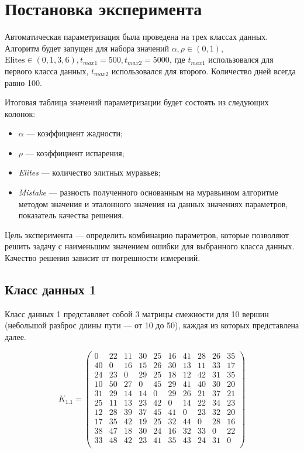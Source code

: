 \clearpage

\section{Постановка эксперимента}

Автоматическая параметризация была проведена на трех классах данных.
Алгоритм будет запущен для набора значений $\alpha, \rho \in (0, 1)$, $\text{Elites} \in (0, 1, 3, 6), t_{max1} = 500, t_{max2} = 5000$, где $t_{max1}$ использовался для первого класса данных, $t_{max2}$ использовался для второго.
Количество дней всегда равно 100.

Итоговая таблица значений параметризации будет состоять из следующих колонок:
\begin{itemize}[label=---]
	\item $\alpha$ --- коэффициент жадности;
	\item $\rho$ --- коэффициент испарения;
	\item \textit{Elites} --- количество элитных муравьев;
	\item \textit{Mistake} --- разность полученного основанным на муравьином алгоритме методом значения и эталонного значения на данных значениях параметров, показатель качества решения.
\end{itemize}

Цель эксперимента --- определить комбинацию параметров, которые позволяют решить задачу с наименьшим значением ошибки для выбранного класса данных.
Качество решения зависит от погрешности измерений.

\subsection{Класс данных 1}\label{par:class1}

Класс данных 1 представляет собой 3 матрицы смежности для 10 вершин (небольшой разброс длины пути --- от 10 до 50), каждая из которых представлена далее.

\begin{equation}
	\label{eq:kd1.1}
	K_{1.1} = \begin{pmatrix}
		0 & 22 & 11 & 30 & 25 & 16 & 41 & 28 & 26 & 35 \\
		40 & 0 & 16 & 15 & 26 & 30 & 13 & 11 & 33 & 17 \\
		24 & 23 & 0 & 29 & 25 & 18 & 12 & 42 & 31 & 35 \\
		10 & 50 & 27 & 0 & 45 & 29 & 41 & 40 & 30 & 20 \\
		31 & 29 & 14 & 14 & 0 & 29 & 26 & 21 & 37 & 21 \\
		25 & 11 & 13 & 23 & 42 & 0 & 14 & 22 & 34 & 23 \\
		12 & 28 & 39 & 37 & 45 & 41 & 0 & 23 & 32 & 20 \\
		17 & 35 & 42 & 19 & 25 & 32 & 44 & 0 & 28 & 16 \\
		38 & 47 & 18 & 30 & 24 & 16 & 32 & 33 & 0 & 22 \\
		33 & 48 & 42 & 23 & 41 & 35 & 43 & 24 & 31 & 0 \\
	\end{pmatrix}
\end{equation}

